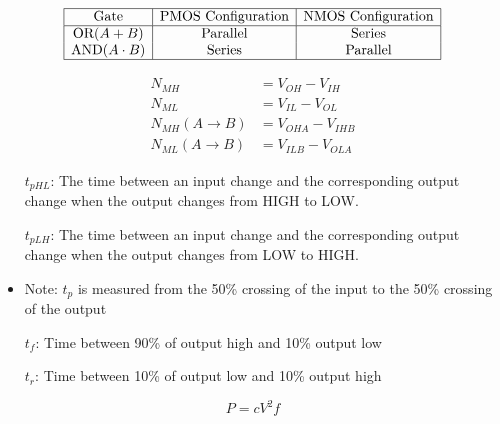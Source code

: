 \documentclass[8pt]{article}
\begin{document}
\[
  \begin{array}{|c|c|c|}
    \hline
    \text{Gate}            & \text{PMOS Configuration} & \text{NMOS Configuration} \\
    \hline
    \text{OR} (A + B)      & \text{Parallel}           & \text{Series}             \\
    \text{AND} (A \cdot B) & \text{Series}             & \text{Parallel}           \\
    \hline
  \end{array}
\]


\begin{align*}
  N_{MH}                  & = V_{OH} - V_{IH}   \\
  N_{ML}                  & = V_{IL} - V_{OL}   \\
  N_{MH}(A \rightarrow B) & = V_{OHA} - V_{IHB} \\
  N_{ML}(A \rightarrow B) & = V_{ILB} - V_{OLA}
\end{align*}

\begin{itemize}
  \item[$t_{pHL}$:] The time between an input change and the corresponding output change
        when the output changes from HIGH to LOW.
  \item[$t_{pLH}$:] The time between an input change and the corresponding output change
        when the output changes from LOW to HIGH.
  \item Note: $t_p$ is measured from the 50\% crossing
        of the input to the 50\% crossing of the output
  \item[$t_f$:] Time between 90\% of output high and 10\% output low
  \item[$t_r$:] Time between 10\% of output low and 10\% output high
\end{itemize}

\[  P = cV^2 f \]
\end{document}
